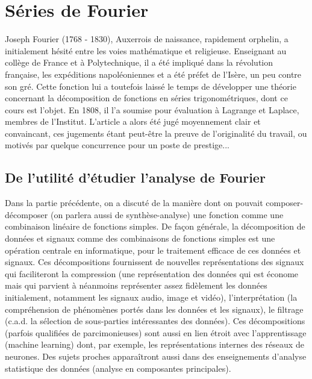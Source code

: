 







\chapter{Séries de Fourier}

Joseph Fourier (1768 - 1830), Auxerrois de naissance, rapidement
orphelin, a initialement hésité entre les voies mathématique et
religieuse. Enseignant au collège de France et à Polytechnique, il a
été impliqué dans la révolution française, les expéditions
napoléoniennes et a été préfet de l'Isère, un peu contre son
gré. Cette fonction lui a toutefois laissé le temps de développer une
théorie concernant la décomposition de fonctions en séries
trigonométriques, dont ce cours est l'objet. En  1808, il l'a soumise
pour évaluation à Lagrange et Laplace, membres de l'Institut. L'article a alors été jugé moyennement clair et convaincant, ces jugements étant peut-être la preuve de l'originalité du travail, ou motivés par quelque concurrence pour un poste de prestige...

\section{De l'utilité d'étudier l'analyse de Fourier}

Dans la partie précédente, on a discuté de la manière dont on pouvait composer-décomposer (on parlera aussi de synthèse-analyse) une fonction  comme une combinaison linéaire de fonctions simples. De façon générale, la décomposition de données et signaux comme des combinaisons de fonctions simples est une opération centrale en informatique, pour le traitement efficace de ces données et signaux. Ces décompositions fournissent de nouvelles représentations des signaux qui faciliteront la compression (une représentation des données qui est économe mais qui parvient à néanmoins représenter assez fidèlement les données initialement, notamment les signaux audio, image et vidéo), l'interprétation (la compréhension de phénomènes portés dans les données et les signaux), le filtrage (c.a.d. la sélection de sous-parties intéressantes des données). Ces décompositions (parfois qualifiées de parcimonieuses) sont aussi en lien étroit avec l'apprentissage (machine learning) dont, par exemple, les représentations internes des réseaux de neurones. Des sujets proches apparaîtront aussi dans des enseignements d'analyse statistique des données (analyse en composantes principales).

